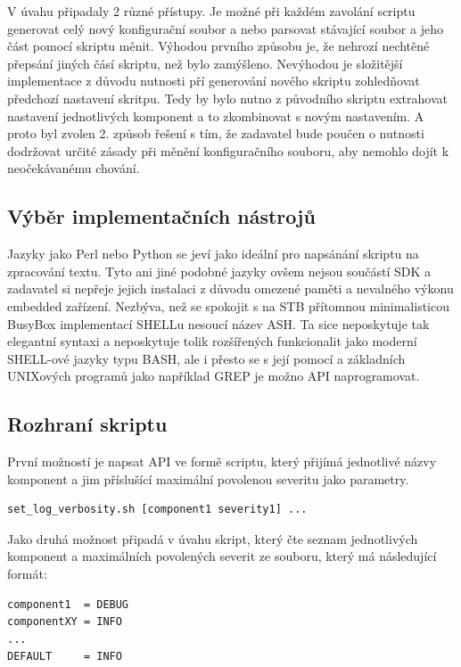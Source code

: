 \documentclass[thesis=B,czech]{FITthesis}[2012/06/26]
\begin{document}
V úvahu připadaly 2 různé přístupy. Je možné při každém zavolání scriptu generovat celý nový konfigurační soubor a nebo parsovat stávající soubor a jeho část pomocí skriptu měnit.
Výhodou prvního způsobu je, že nehrozí nechtěné přepsání jiných čásí skriptu, než bylo zamýšleno. Nevýhodou je složitější implementace z důvodu nutnosti pří generování nového skriptu zohledňovat předchozí nastavení skritpu. Tedy by bylo nutno z původního skriptu extrahovat nastavení jednotlivých komponent a to zkombinovat s novým nastavením.
A proto byl zvolen 2. způsob řešení s tím, že zadavatel bude poučen o nutnosti dodržovat určité zásady při měnění konfiguračního souboru, aby nemohlo dojít k neočekávanému chování.

\subsection{Výběr implementačních nástrojů}
Jazyky jako Perl nebo Python se jeví jako ideální pro napsánání skriptu na zpracování textu. Tyto ani jiné podobné jazyky ovšem nejsou součástí SDK a zadavatel si nepřeje jejich instalaci z důvodu omezené paměti a nevalného výkonu embedded zařízení. Nezbýva, než se spokojit s na STB přítomnou minimalisticou BusyBox implementací SHELLu nesoucí název ASH. Ta sice neposkytuje tak elegantní syntaxi a neposkytuje tolik rozšířených funkcionalit jako moderní SHELL-ové jazyky typu BASH, ale i přesto se s její pomocí a základních UNIXových programů jako například GREP je možno API naprogramovat.

\subsection{Rozhraní skriptu}
První možností je napsat API ve formě scriptu, který přijímá jednotlivé názvy komponent a jim příslušící maximální povolenou severitu jako parametry.

\begin{lstlisting}[style=RainerScriptSimpleStyle]
set_log_verbosity.sh [component1 severity1] ...
\end{lstlisting}

Jako druhá možnost připadá v úvahu skript, který čte seznam jednotlivých komponent a maximálních povolených severit ze souboru, který má následující formát:

\begin{lstlisting}[style=RainerScriptSimpleStyle]
component1  = DEBUG
componentXY = INFO
...
DEFAULT     = INFO
\end{lstlisting}
\end{document}
